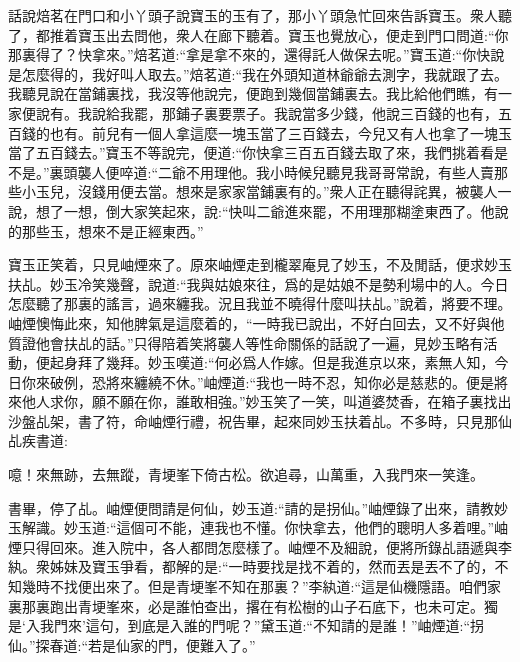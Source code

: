 


\begin{parag}
    話說焙茗在門口和小丫頭子說寶玉的玉有了，那小丫頭急忙回來告訴寶玉。衆人聽了，都推着寶玉出去問他，衆人在廊下聽着。寶玉也覺放心，便走到門口問道:“你那裏得了？快拿來。”焙茗道:“拿是拿不來的，還得託人做保去呢。”寶玉道:“你快說是怎麼得的，我好叫人取去。”焙茗道:“我在外頭知道林爺爺去測字，我就跟了去。我聽見說在當鋪裏找，我沒等他說完，便跑到幾個當鋪裏去。我比給他們瞧，有一家便說有。我說給我罷，那鋪子裏要票子。我說當多少錢，他說三百錢的也有，五百錢的也有。前兒有一個人拿這麼一塊玉當了三百錢去，今兒又有人也拿了一塊玉當了五百錢去。”寶玉不等說完，便道:“你快拿三百五百錢去取了來，我們挑着看是不是。”裏頭襲人便啐道:“二爺不用理他。我小時候兒聽見我哥哥常說，有些人賣那些小玉兒，沒錢用便去當。想來是家家當鋪裏有的。”衆人正在聽得詫異，被襲人一說，想了一想，倒大家笑起來，說:“快叫二爺進來罷，不用理那糊塗東西了。他說的那些玉，想來不是正經東西。”
\end{parag}


\begin{parag}
    寶玉正笑着，只見岫煙來了。原來岫煙走到櫳翠庵見了妙玉，不及閒話，便求妙玉扶乩。妙玉冷笑幾聲，說道:“我與姑娘來往，爲的是姑娘不是勢利場中的人。今日怎麼聽了那裏的謠言，過來纏我。況且我並不曉得什麼叫扶乩。”說着，將要不理。岫煙懊悔此來，知他脾氣是這麼着的，“一時我已說出，不好白回去，又不好與他質證他會扶乩的話。”只得陪着笑將襲人等性命關係的話說了一遍，見妙玉略有活動，便起身拜了幾拜。妙玉嘆道:“何必爲人作嫁。但是我進京以來，素無人知，今日你來破例，恐將來纏繞不休。”岫煙道:“我也一時不忍，知你必是慈悲的。便是將來他人求你，願不願在你，誰敢相強。”妙玉笑了一笑，叫道婆焚香，在箱子裏找出沙盤乩架，書了符，命岫煙行禮，祝告畢，起來同妙玉扶着乩。不多時，只見那仙乩疾書道:
\end{parag}


\begin{qute2sp}
    噫！來無跡，去無蹤，青埂峯下倚古松。欲追尋，山萬重，入我門來一笑逢。
\end{qute2sp}


\begin{parag}
    書畢，停了乩。岫煙便問請是何仙，妙玉道:“請的是拐仙。”岫煙錄了出來，請教妙玉解識。妙玉道:“這個可不能，連我也不懂。你快拿去，他們的聰明人多着哩。”岫煙只得回來。進入院中，各人都問怎麼樣了。岫煙不及細說，便將所錄乩語遞與李紈。衆姊妹及寶玉爭看，都解的是:“一時要找是找不着的，然而丟是丟不了的，不知幾時不找便出來了。但是青埂峯不知在那裏？”李紈道:“這是仙機隱語。咱們家裏那裏跑出青埂峯來，必是誰怕查出，撂在有松樹的山子石底下，也未可定。獨是‘入我門來’這句，到底是入誰的門呢？”黛玉道:“不知請的是誰！”岫煙道:“拐仙。”探春道:“若是仙家的門，便難入了。”
\end{parag}


